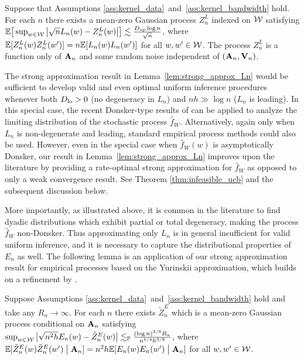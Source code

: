 \begin{lemma}
  \label{lem:strong_approx_Ln}
  Suppose that Assumptions \ref{ass:kernel_data}~and~\ref{ass:kernel_bandwidth}
  hold. For each $n$ there exists a mean-zero Gaussian process $Z^L_n$ indexed
  on $\mathcal{W}$ satisfying
  $\mathbb{E}\big[ \sup_{w \in \mathcal{W}} \big| \sqrt{n} L_n(w) - Z_n^L(w) \big| \big]
  \lesssim \frac{D_{\textup{up}} \log n}{\sqrt{n}}$, where
  $\mathbb{E}[Z_n^L(w)Z_n^L(w')] =  n\mathbb{E}[L_n(w)L_n(w')]$ for all $w, w' \in \mathcal{W}$. The
  process $Z_n^L$ is a function only of $\mathbf{A}_n$ and some random noise
  independent of $(\mathbf{A}_n, \mathbf{V}_n)$.
\end{lemma}

The strong approximation result in Lemma~\ref{lem:strong_approx_Ln} would be
sufficient to develop valid and even optimal uniform inference procedures
whenever both $D_{\textup{lo}} > 0$ (no degeneracy in $L_n$) and $n h \gg \log n$
($L_n$ is leading). In this special case, the recent Donsker-type results of
\citet{davezies2021exchangeable} can be applied to analyze the limiting
distribution of the stochastic process $\hat{f}_W$. Alternatively, again only
when $L_n$ is non-degenerate and leading, standard empirical process methods
could also be used. However, even in the special case when $\hat{f}_W(w)$ is
asymptotically Donsker, our result in Lemma~\ref{lem:strong_approx_Ln} improves
upon the literature by providing a rate-optimal strong approximation for
$\hat{f}_W$ as opposed to only a weak convergence result. See Theorem
\ref{thm:infeasible_ucb} and the subsequent discussion below.

More importantly, as illustrated above, it is common in the literature to find
dyadic distributions which exhibit partial or total degeneracy, making the
process $\hat{f}_W$ non-Donsker. Thus approximating only $L_n$ is in general
insufficient for valid uniform inference, and it is necessary to capture the
distributional properties of $E_n$ as well.
The following lemma is an application of our strong approximation result for
empirical processes based on the Yurinskii approximation, which builds on a
refinement by \citet{belloni2019conditional}.

\begin{lemma}
  \label{lem:conditional_strong_approx_En}
  Suppose Assumptions \ref{ass:kernel_data}~and~\ref{ass:kernel_bandwidth} hold
  and take any $R_n \to \infty$. For each $n$ there exists $\tilde Z^E_n$
  which is a mean-zero Gaussian process conditional on $\mathbf{A}_n$ satisfying
  $\sup_{w \in \mathcal{W}}
  \big| \sqrt{n^2h} E_n(w) - \tilde Z_n^E(w) \big|
  \lesssim_{\mathbb{P}} \frac{(\log n)^{3/8} R_n}{n^{1/4}h^{3/8}}$,
  where $\mathbb{E}[\tilde Z_n^E(w)\tilde Z_n^E(w')\bigm\vert \mathbf{A}_n]
  =n^2h\mathbb{E}[E_n(w)E_n(w')\bigm\vert \mathbf{A}_n]$
  for all $w, w' \in \mathcal{W}$.
\end{lemma}

